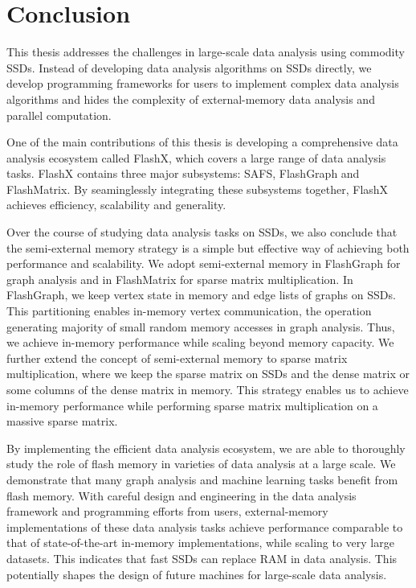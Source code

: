 \chapter{Conclusion}
\label{sec:conclu}
\chaptermark{}

This thesis addresses the challenges in large-scale data analysis using commodity
SSDs. Instead of developing
data analysis algorithms on SSDs directly, we develop programming frameworks
for users to implement complex data analysis algorithms and hides the complexity
of external-memory data analysis and parallel computation.

One of the main contributions of this thesis is
developing a comprehensive data analysis ecosystem called FlashX, which covers
a large range of data analysis tasks. FlashX contains three major subsystems:
SAFS, FlashGraph and FlashMatrix. By seaminglessly integrating these subsystems
together, FlashX achieves efficiency, scalability and generality.

Over the course of studying data analysis tasks on SSDs, we also conclude that
the semi-external memory strategy is a simple but effective way of achieving
both performance and scalability. We adopt semi-external memory in FlashGraph
for graph analysis and in FlashMatrix for sparse matrix multiplication.
In FlashGraph, we keep vertex state in memory and edge lists of graphs on SSDs.
This partitioning enables in-memory vertex communication, the operation
generating majority of small random memory accesses in graph analysis. Thus, we
achieve in-memory performance while scaling beyond memory capacity. We further
extend the concept of semi-external memory to sparse matrix multiplication,
where we keep the sparse matrix on SSDs and the dense matrix or some
columns of the dense matrix in memory. This strategy enables us to achieve
in-memory performance while performing sparse matrix multiplication on a massive
sparse matrix.

By implementing the efficient data analysis ecosystem, we are able to thoroughly
study the role of flash memory in varieties of data analysis at a large scale.
We demonstrate that many graph analysis and machine learning tasks benefit from
flash memory. With careful design and engineering in the data analysis framework
and programming efforts from users, external-memory implementations
of these data analysis tasks achieve performance comparable to that of
state-of-the-art in-memory implementations, while scaling to very large datasets.
This indicates that fast SSDs can replace RAM in data analysis. This potentially
shapes the design of future machines for large-scale data analysis.
